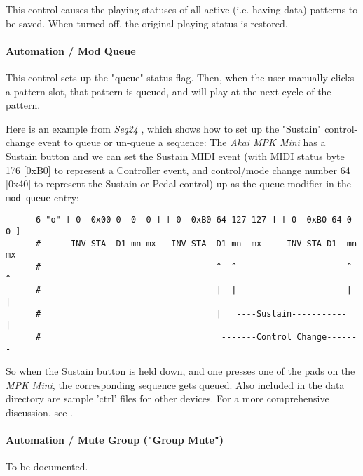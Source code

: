    This control causes the playing statuses of all active
   (i.e. having data) patterns to be saved.  When turned off, the
   original playing status is restored.

\paragraph{Automation / Mod Queue}
\label{paragraph:configuration_midi_ctrl_modqueue}

   This control sets up the "queue" status flag.
   Then, when the user manually clicks a pattern slot,
   that pattern is queued, and will play at the next cycle of the
   pattern.

   Here is an example from  \textsl{Seq24} \cite{midicontrol},
   which shows how to set up
   the "Sustain" control-change event to queue or un-queue a sequence:
   The \textsl{Akai MPK Mini} has a Sustain button and we can set the
   Sustain MIDI event (with MIDI status byte 176 [0xB0] to represent a
   Controller event, and control/mode change number 64 [0x40] to
   represent the Sustain or Pedal control) up as the queue modifier in
   the \texttt{mod queue} entry:

   \begin{verbatim}
      6 "o" [ 0  0x00 0  0  0 ] [ 0  0xB0 64 127 127 ] [ 0  0xB0 64 0  0 ]
      #      INV STA  D1 mn mx   INV STA  D1 mn  mx     INV STA D1  mn mx
      #                                   ^  ^                      ^  ^
      #                                   |  |                      |  |
      #                                   |   ----Sustain-----------   |
      #                                    -------Control Change-------
   \end{verbatim}

   So when the Sustain button is held down, and one presses one of the pads
   on the \textsl{MPK Mini}, the corresponding sequence gets queued.
   Also included in the data directory are sample 'ctrl' files for other
   devices.
   For a more comprehensive discussion, see
   .

\paragraph{Automation / Mute Group ("Group Mute")}
\label{paragraph:configuration_midi_ctrl_modgmute}

   To be documented.

